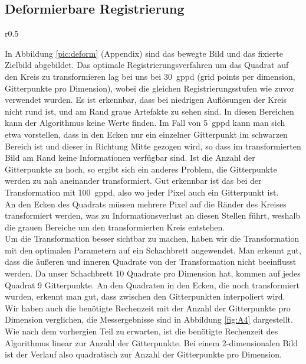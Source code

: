\subsection{Deformierbare Registrierung}
\begin{wrapfigure}{r}{0.5\linewidth}
  \vspace{-6pt}
  \vspace{-10pt}
  \caption{Berechnungsdauer der deformierbaren Registrierung in Abhängigkeit der Anzahl der Gitterpunkte pro Dimension}
  \label{fig:A4}
  \vspace{-10pt}
  \resizebox{\linewidth}{!}{}
  \vspace{-30pt}
\end{wrapfigure}
In Abbildung \ref{pic:deform} (Appendix) sind das bewegte Bild und das fixierte
Zielbild abgebildet. Das optimale Registrierungsverfahren um das Quadrat auf
den Kreis zu transformieren lag bei uns bei \SI{30}{gppd} (grid points per
dimension, Gitterpunkte pro Dimension), wobei die gleichen Registrierungsstufen
wie zuvor verwendet wurden. Es ist erkennbar, dass bei niedrigen Auflösungen
der Kreis nicht rund ist, und am Rand graue Artefakte zu sehen sind. In diesen
Bereichen kann der Algorithmus keine Werte finden. Im Fall von \SI{5}{gppd}
kann man sich etwa vorstellen, dass in den Ecken nur ein einzelner Gitterpunkt
im schwarzen Bereich ist und dieser in Richtung Mitte gezogen wird, so dass im
transformierten Bild am Rand keine Informationen verfügbar sind. Ist die Anzahl
der Gitterpunkte zu hoch, so ergibt sich ein anderes Problem, die Gitterpunkte
werden zu nah aneinander transformiert. Gut erkennbar ist das bei der
Transformation mit \SI{100}{gppd}, also wo jeder Pixel auch ein Gitterpunkt
ist.\\
An den Ecken des Quadrats müssen mehrere Pixel auf die Ränder des Kreises
transformiert werden, was zu Informationsverlust an diesen Stellen führt,
weshalb die grauen Bereiche um den transformierten Kreis entstehen.\\
Um die Transformation besser sichtbar zu machen, haben wir die Transformation
mit den optimalen Parametern auf ein Schachbrett angewendet. Man erkennt gut,
dass die äußeren und inneren Quadrate von der Transformation nicht beeinflusst
werden. Da unser Schachbrett \num{10} Quadrate pro Dimension hat, kommen auf
jedes Quadrat \num{9} Gitterpunkte. An den Quadraten in den Ecken, die noch
transformiert wurden, erkennt man gut, dass zwischen den Gitterpunkten
interpoliert wird.\\
Wir haben auch die benötigte Rechenzeit mit der Anzahl der Gitterpunkte pro
Dimension verglichen, die Messergebnisse sind in Abbildung \ref{fig:A4}
dargestellt. Wie nach dem vorhergien Teil zu erwarten, ist die benötigte
Rechenzeit des Algorithmus linear zur Anzahl der Gitterpunkte. Bei einem
2-dimensionalen Bild ist der Verlauf also quadratisch zur Anzahl der
Gitterpunkte pro Dimension.
